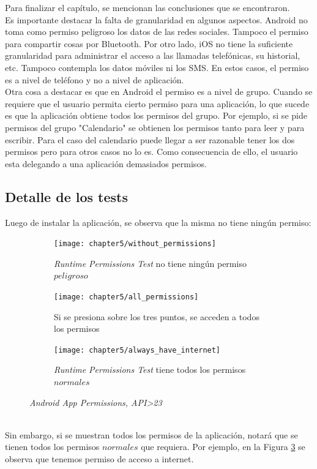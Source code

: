 Para finalizar el capítulo, se mencionan las conclusiones que se encontraron.\\
Es importante destacar la falta de granularidad en algunos aspectos. Android no toma como permiso peligroso los datos de las redes sociales. Tampoco el permiso para compartir cosas por Bluetooth. Por otro lado, iOS no tiene la suficiente granularidad para administrar el acceso a las llamadas telefónicas, su historial, etc. Tampoco contempla los datos móviles ni los SMS. En estos casos, el permiso es a nivel de teléfono y no a nivel de aplicación.\\

Otra cosa a destacar es que en Android el permiso es a nivel de grupo. Cuando se requiere que el usuario permita cierto permiso para una aplicación, lo que sucede es que la aplicación obtiene todos los permisos del grupo. Por ejemplo, si se pide permisos del grupo "Calendario" se obtienen los permisos tanto para leer y para escribir. Para el caso del calendario puede llegar a ser razonable tener los dos permisos pero para otros casos no lo es. Como consecuencia de ello, el usuario esta delegando a una aplicación demasiados permisos.
\subsection*{Detalle de los tests}
Luego de instalar la aplicación, se observa que la misma no tiene ningún permiso:
\begin{figure}[!ht]
	\centering
	\begin{subfigure}{.32\textwidth}
		\texttt{[image: chapter5/without\_permissions]}
		\caption{\textit{Runtime Permissions Test} no tiene ningún permiso $peligroso$}
		\label{fig:chapter05:without_permissions}
	\end{subfigure}
	\begin{subfigure}{.32\textwidth}
		\texttt{[image: chapter5/all\_permissions]}
		\caption{Si se presiona sobre los tres puntos, se acceden a todos los permisos}
		\label{fig:chapter05:all_permissions}
	\end{subfigure}
	\begin{subfigure}{.32\textwidth}
		\texttt{[image: chapter5/always\_have\_internet]}
		\caption{\textit{Runtime Permissions Test} tiene todos los permisos $normales$}
		\label{fig:chapter05:always_have_internet}
	\end{subfigure}
	\caption{\textit{Android App Permissions, API\textgreater 23}}
	\label{fig:chapter05:android_permissions}
\end{figure}\\
Sin embargo, si se muestran todos los permisos de la aplicación, notará que se tienen todos los permisos $normales$ que requiera. Por ejemplo, en la Figura \ref{fig:chapter05:always_have_internet} se observa que tenemos permiso de acceso a internet.

